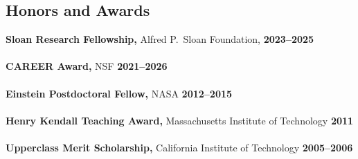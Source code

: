 \documentclass[margin,line]{res}
\begin{document}
\begin{resume}
  \section{\sc Honors and Awards}
   {\bf Sloan Research Fellowship,}
  Alfred P.\ Sloan Foundation,
  \hfill {\bf 2023--2025}\\
  \\
  {\bf CAREER Award,} NSF \hfill {\bf 2021--2026}\\
  \\
  {\bf Einstein Postdoctoral Fellow,} NASA \hfill {\bf 2012--2015}\\
  \\
  {\bf Henry Kendall Teaching Award,} Massachusetts Institute of Technology \hfill {\bf 2011}\\
  \\
  {\bf Upperclass Merit Scholarship,} California Institute of Technology \hfill {\bf 2005--2006}\\

  \vspace{-1em}


\end{resume}
\end{document}
